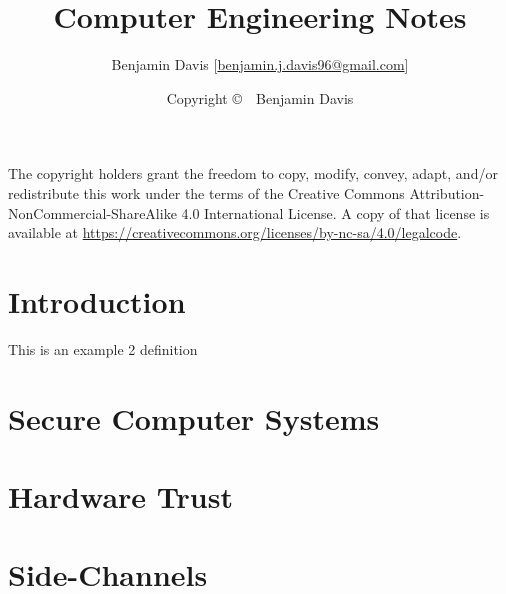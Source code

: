 \documentclass[letterpaper,12pt]{book}
\title{Computer Engineering Notes}
\author{
  Benjamin Davis [\href{mailto:benjamin.j.davis96@gmail.com}{benjamin.j.davis96@gmail.com}]
}
\date{Copyright \copyright\ \the\year\ Benjamin Davis}
\begin{document}
  \pagestyle{simple}
  \maketitle
  
  \begin{center}
    \vspace*{\fill}
    The copyright holders grant the freedom to copy, modify, convey, adapt, and/or redistribute this work
    under the terms of the Creative Commons Attribution-NonCommercial-ShareAlike 4.0
    International License. A copy of that license is available at
    \url{https://creativecommons.org/licenses/by-nc-sa/4.0/legalcode}.
    \vspace*{\fill}
  \end{center}

  \frontmatter
  \pagestyle{plain}

  \tableofcontents

  \mainmatter

  \chapter{Introduction}
  \label{chap:introduction}

    \begin{defbox}
      \label{def:example2}
      This is an example 2 definition
    \end{defbox}
  
  \chapter{Secure Computer Systems}
  \label{chap:secure_computer_systems}

    

  \chapter{Hardware Trust}
  \label{chap:hardware_trust}

  \chapter{Side-Channels}
  \label{chap:side_channels}

    

  
  
\end{document}
